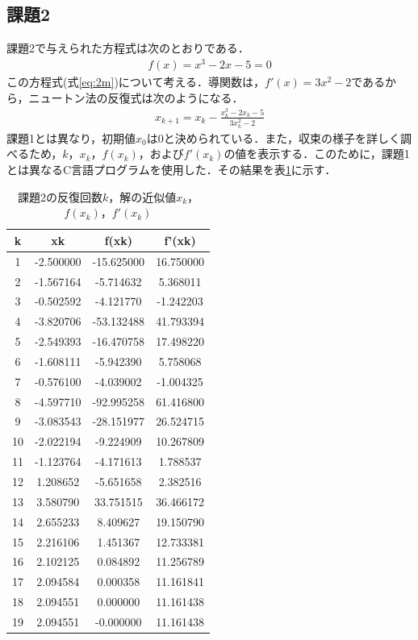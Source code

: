 \documentclass[12pt]{jarticle}
\renewcommand  \[  {\begin{eqnarray}}
\renewcommand  \]  {\end{eqnarray}}
\begin{document}
\subsection{課題2}
課題2で与えられた方程式は次のとおりである．
\[
f(x)=x^3-2x-5 = 0
\label{eq:2m}
\]
この方程式(式\ref{eq:2m})について考える．導関数は，$f\prime(x)=3x^2-2$であるから，ニュートン法の反復式は次のようになる．
\[
x_{k+1}=x_k- \frac{x_k^3-2x_k-5}{3x_k^2-2}
\label{eq:2}
\]
課題1とは異なり，初期値$x_0$は$0$と決められている．また，収束の様子を詳しく調べるため，$k$，$x_k$，$f(x_k)$，および$f\prime(x_k)$の値を表示する．このために，課題1とは異なるC言語プログラムを使用した．その結果を表\ref{tab:2}に示す．
\begin{table}[t]
\caption{課題2の反復回数$k$，解の近似値$x_k$，$f(x_k)$，$f\prime(x_k)$}
\label{tab:2}
\center
\begin{tabular}{|c|c|c|c|}
\hline
k & xk & f(xk) & f'(xk)\\
\hline
1 & -2.500000 & -15.625000 & 16.750000 \\
2 & -1.567164 & -5.714632 & 5.368011 \\
3 & -0.502592 & -4.121770 & -1.242203 \\
4 & -3.820706 & -53.132488 & 41.793394 \\
5 & -2.549393 & -16.470758 & 17.498220 \\
6 & -1.608111 & -5.942390 & 5.758068 \\
7 & -0.576100 & -4.039002 & -1.004325 \\
8 & -4.597710 & -92.995258 & 61.416800 \\
9 & -3.083543 & -28.151977 & 26.524715 \\
10 & -2.022194 & -9.224909 & 10.267809 \\
11 & -1.123764 & -4.171613 & 1.788537 \\
12 & 1.208652 & -5.651658 & 2.382516 \\
13 & 3.580790 & 33.751515 & 36.466172 \\
14 & 2.655233 & 8.409627 & 19.150790 \\
15 & 2.216106 & 1.451367 & 12.733381 \\
16 & 2.102125 & 0.084892 & 11.256789 \\
17 & 2.094584 & 0.000358 & 11.161841 \\
18 & 2.094551 & 0.000000 & 11.161438 \\
19 & 2.094551 & -0.000000 & 11.161438 \\
\hline
\end{tabular}
\end{table}
\end{document}

